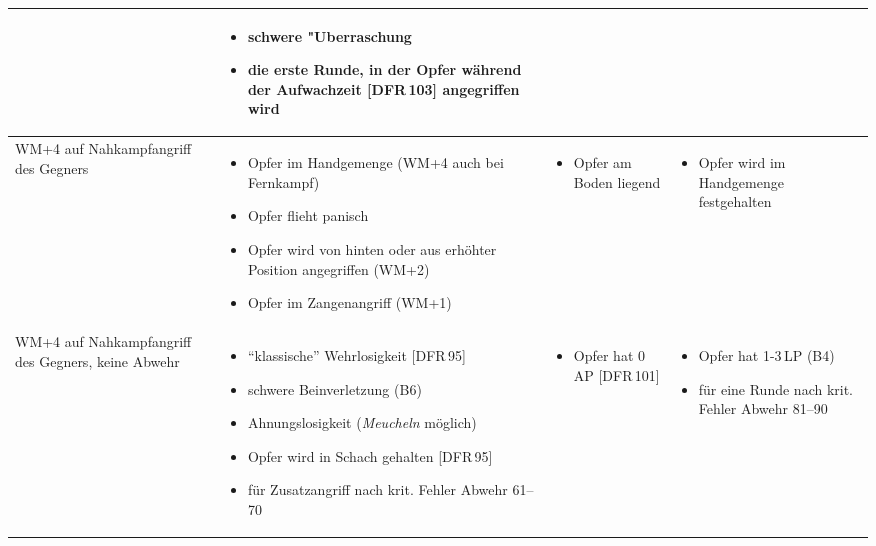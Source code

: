\documentclass[10pt,a4paper,germanpar]{article}
\begin{document}
\begin{table}[htbp]
{\begin{center}
\begin{tabu}{|p{2.4cm}||p{4.3cm}|p{4.1cm}|p{4.5cm}|}
\begin{itemize}
      \end{itemize}      &
      \begin{itemize}
      \item schwere "Uberraschung
      \item die erste Runde, in der Opfer während der Aufwachzeit
        [DFR\,103] angegriffen wird
      \end{itemize} \\
      \hline
      WM+4 auf Nahkampfangriff des Gegners &
      \begin{itemize}
      \item Opfer im Handgemenge (WM+4 auch bei Fernkampf)
      \item Opfer flieht panisch
      \item Opfer wird von hinten oder aus erhöhter Position
        angegriffen (WM+2)
      \item Opfer im Zangenangriff (WM+1)
      \end{itemize} &
      \begin{itemize}
      \item Opfer am Boden liegend
      \end{itemize} &
      \begin{itemize}
      \item Opfer wird im Handgemenge festgehalten
      \end{itemize}
      \\
      \hline
      WM+4 auf Nahkampfangriff des Gegners, keine Abwehr &
      \begin{itemize}
      \item "`klassische"' Wehrlosigkeit [DFR\,95]
      \item schwere Beinverletzung (B6)
      \item Ahnungslosigkeit (\emph{Meucheln} möglich)
      \item Opfer wird in Schach gehalten [DFR\,95]
      \item für Zusatzangriff nach krit. Fehler Abwehr 61--70
      \end{itemize}&
      \begin{itemize}
      \item Opfer hat 0\,AP [DFR\,101]
      \end{itemize}& 
      \begin{itemize}
      \item Opfer hat 1-3\,LP (B4)
      \item für eine Runde nach krit. Fehler Abwehr 81--90
      \end{itemize}\\

\end{tabu}
\end{center}}
\end{table}
\end{document}
